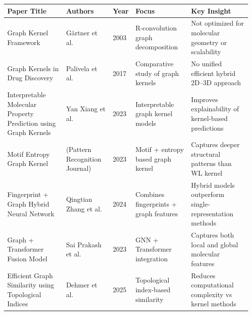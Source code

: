 \documentclass[aspectratio=169, 11pt]{beamer}
\begin{document}
\begin{frame}
\scriptsize
\setlength{\tabcolsep}{2pt}

\begin{tabular}{|p{2.8cm}|p{2.3cm}|p{0.9cm}|p{3.2cm}|p{3.8cm}|}
\hline
\textbf{Paper Title} & \textbf{Authors} & \textbf{Year} & \textbf{Focus} & \textbf{Key Insight} \\ \hline

Graph Kernel Framework \cite{gartner2003graphkernels}
& Gärtner et al. 
& 2003 
& R-convolution graph decomposition 
& Not optimized for molecular geometry or scalability \\ \hline

Graph Kernels in Drug Discovery \cite{palivela2017graphkernels}
& Palivela et al. 
& 2017 
& Comparative study of graph kernels 
& No unified efficient hybrid 2D–3D approach \\ \hline

Interpretable Molecular Property Prediction using Graph Kernels \cite{xiang2023interpretable}
& Yan Xiang et al. 
& 2023 
& Interpretable graph kernel models 
& Improves explainability of kernel-based predictions \\ \hline

Motif Entropy Graph Kernel \cite{motif2023kernel}
& (Pattern Recognition Journal) 
& 2023 
& Motif + entropy based graph kernel 
& Captures deeper structural patterns than WL kernel \\ \hline

Fingerprint + Graph Hybrid Neural Network \cite{zhang2024hybrid}
& Qingtian Zhang et al. 
& 2024 
& Combines fingerprints + graph features 
& Hybrid models outperform single-representation methods \\ \hline

Graph + Transformer Fusion Model \cite{prakash2023fusion}
& Sai Prakash et al. 
& 2023 
& GNN + Transformer integration 
& Captures both local and global molecular features \\ \hline

Efficient Graph Similarity using Topological Indices \cite{dehmer2025topological}
& Dehmer et al. 
& 2025 
& Topological index-based similarity 
& Reduces computational complexity vs kernel methods \\ \hline

\end{tabular}

\end{frame}
\end{document}
